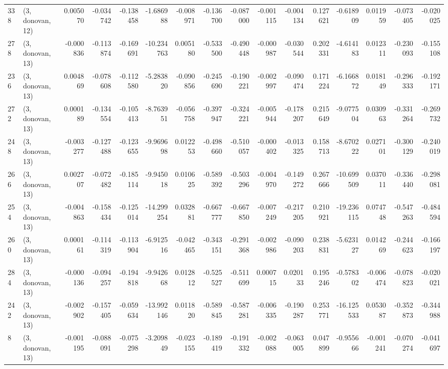 \begin{tabular}{llrrrrrrrrrrrrrr}
338 &  (3, donovan, 12) &   0.005070 & -0.034742 & -0.138458 &  -1.686988 & -0.008971 &  -0.136700 & -0.087000 & -0.001115 & -0.004134 &  0.127621 &    -0.618909 &   0.011959 &  -0.073405 &  -0.020025 \\
278 &  (3, donovan, 13) &  -0.000836 & -0.113874 & -0.169691 & -10.234763 &  0.005180 &  -0.533500 & -0.490448 & -0.000987 & -0.030544 &  0.202331 &    -4.614183 &   0.012311 &  -0.230093 &  -0.155108 \\
236 &  (3, donovan, 13) &   0.004869 & -0.078608 & -0.112580 &  -5.283820 & -0.090856 &  -0.245690 & -0.190221 & -0.002997 & -0.090474 &  0.171224 &    -6.166872 &   0.018149 &  -0.296333 &  -0.192171 \\
272 &  (3, donovan, 13) &   0.000189 & -0.134554 & -0.105413 &  -8.763951 & -0.056758 &  -0.397947 & -0.324221 & -0.005944 & -0.178207 &  0.215649 &    -9.077504 &   0.030963 &  -0.331264 &  -0.269732 \\
248 &  (3, donovan, 13) &  -0.003277 & -0.127488 & -0.123655 &  -9.969698 &  0.012253 &  -0.498660 & -0.510057 & -0.000402 & -0.013325 &  0.158713 &    -8.670222 &   0.027101 &  -0.300129 &  -0.240019 \\
266 &  (3, donovan, 13) &   0.002707 & -0.072482 & -0.185114 &  -9.945018 &  0.010625 &  -0.589392 & -0.503296 & -0.004970 & -0.149272 &  0.267666 &   -10.699509 &   0.037011 &  -0.336440 &  -0.298081 \\
254 &  (3, donovan, 13) &  -0.004863 & -0.158434 & -0.125014 & -14.299254 &  0.032881 &  -0.667777 & -0.667850 & -0.007249 & -0.217205 &  0.210921 &   -19.236115 &   0.074748 &  -0.547263 &  -0.484594 \\
260 &  (3, donovan, 13) &   0.000161 & -0.114319 & -0.113904 &  -6.912516 & -0.042465 &  -0.343151 & -0.291368 & -0.002986 & -0.090203 &  0.238831 &    -5.623127 &   0.014269 &  -0.244623 &  -0.166197 \\
284 &  (3, donovan, 13) &  -0.000136 & -0.094257 & -0.194818 &  -9.942668 &  0.012812 &  -0.525527 & -0.511699 &  0.000715 &  0.020133 &  0.195246 &    -0.578302 &  -0.006474 &  -0.078823 &  -0.020021 \\
242 &  (3, donovan, 13) &  -0.002902 & -0.157405 & -0.059634 & -13.992146 &  0.011820 &  -0.589845 & -0.587281 & -0.006335 & -0.190287 &  0.253771 &   -16.125533 &   0.053087 &  -0.352873 &  -0.344988 \\
8   &  (3, donovan, 13) &  -0.001195 & -0.088091 & -0.075298 &  -3.209849 & -0.023155 &  -0.189419 & -0.191332 & -0.002088 & -0.063005 &  0.047899 &    -0.955666 &  -0.001241 &  -0.070274 &  -0.041697 \\

\end{tabular}
